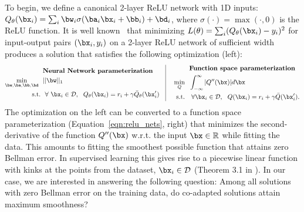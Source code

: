 To begin, we define a canonical 2-layer ReLU network with 1D inputs: $Q_\theta(\bx_i) = \sum_i \bw_i \sigma(\ba_i \bx_i + \bb_i) + \bd_i$, where $\sigma(\cdot) = \max(\cdot, 0)$ is the ReLU function. It is well known~\citep{wei2019regularization,savarese2019infinite} that minimizing $L(\theta) = \sum_i (Q_\theta(\bx_i) - y_i)^2$ for input-output pairs $(\bx_i, y_i)$ on a 2-layer ReLU network of sufficient width produces a solution that satisfies the following optimization (left):
\begin{equation}
\begin{aligned}
    &\text{\textbf{Neural Network parameterization}} \\
    \min_{\bw, \ba, \bb, \bd}~~& ||\bw||_1 \\
    \text{s.t.}~&~ \forall~ \bx_i \in \mathcal{D},~~ Q_\theta(\bx_i) = r_i + \gamma \bar{Q}_\theta(\bx'_i) 
    \label{eqn:relu_nets}
\end{aligned}
\;~~ \vline\;
\begin{aligned}
    &\text{\textbf{Function space parameterization}} \\
    ~~~\min_{Q}~~& \int_{-\infty}^{\infty} |Q''(\bx)| d \bx \\
    \text{s.t.}~~&~ \forall \bx_i \in \mathcal{D}, ~~ Q(\bx_i) = r_i + \gamma \bar{Q}(\bx'_i).
\end{aligned}
\end{equation}
The optimization on the left can be converted to a function space parameterization (Equation~\ref{eqn:relu_nets}, right) that minimizes the second-derivative of the function $Q''(\bx)$ w.r.t. the input $\bx \in \mathbb{R}$ while fitting the data. This amounts to fitting the smoothest possible function that attains zero Bellman error.
In supervised learning this gives rise to a piecewise linear function with kinks at the points from the dataset, $\bx_i \in \mathcal{D}$ (Theorem 3.1 in \citet{savarese2019infinite}). In our case, we are interested in answering the following question: Among all solutions with zero Bellman error on the training data, do co-adapted solutions attain maximum smoothness? 

